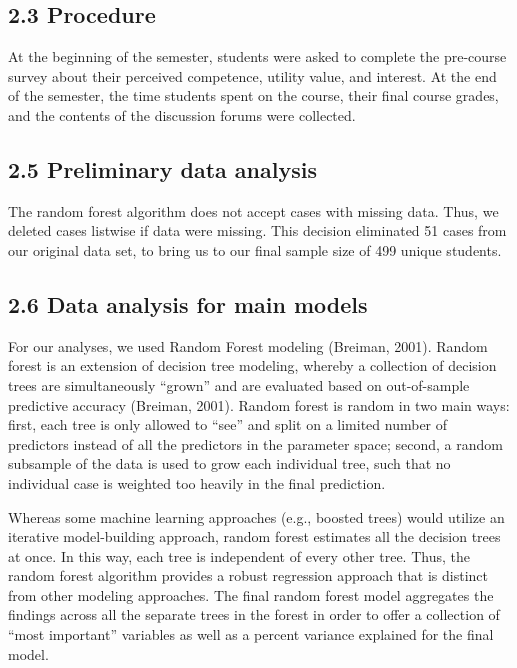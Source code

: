 \documentclass[acmart]{apa6}
\theoremstyle{definition}
\theoremstyle{definition}
\theoremstyle{definition}
\theoremstyle{remark}
\begin{document}
\subsection{2.3 Procedure}\label{procedure}

At the beginning of the semester, students were asked to complete the
pre-course survey about their perceived competence, utility value, and
interest. At the end of the semester, the time students spent on the
course, their final course grades, and the contents of the discussion
forums were collected.

\subsection{2.5 Preliminary data
analysis}\label{preliminary-data-analysis}

The random forest algorithm does not accept cases with missing data.
Thus, we deleted cases listwise if data were missing. This decision
eliminated 51 cases from our original data set, to bring us to our final
sample size of 499 unique students.

\subsection{2.6 Data analysis for main
models}\label{data-analysis-for-main-models}

For our analyses, we used Random Forest modeling (Breiman, 2001). Random
forest is an extension of decision tree modeling, whereby a collection
of decision trees are simultaneously \enquote{grown} and are evaluated
based on out-of-sample predictive accuracy (Breiman, 2001). Random
forest is random in two main ways: first, each tree is only allowed to
\enquote{see} and split on a limited number of predictors instead of all
the predictors in the parameter space; second, a random subsample of the
data is used to grow each individual tree, such that no individual case
is weighted too heavily in the final prediction.

Whereas some machine learning approaches (e.g., boosted trees) would
utilize an iterative model-building approach, random forest estimates
all the decision trees at once. In this way, each tree is independent of
every other tree. Thus, the random forest algorithm provides a robust
regression approach that is distinct from other modeling approaches. The
final random forest model aggregates the findings across all the
separate trees in the forest in order to offer a collection of
\enquote{most important} variables as well as a percent variance
explained for the final model.
\end{document}
